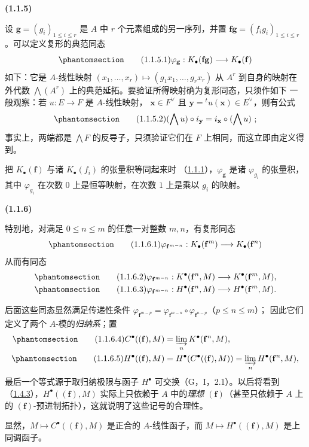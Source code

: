 \documentclass[UTF8,fontset=none,11pt,oneside,openany]{ctexbook}
\newenvironment{env}[1][]{%
  \par\medskip\noindent\textbf{(#1)}\ %
}{\par}
\newcommand{\oldpage}[2][]{%
  \hypertarget{ega-source-page-#1-#2}{}%
  \marginnote{\scriptsize\textbf{#1}~|~#2}\ignorespaces}
\let\EGAOriginalLabel\label
\renewcommand{\label}[1]{\phantomsection\EGAOriginalLabel{#1}}
\begin{document}
\begin{env}[1.1.5]
\label{III.1.1.5-fr}
设 $\mathbf g=(g_i)_{1\leq i\leq r}$ 是 $A$ 中 $r$ 个元素组成的另一序列，并置
$\mathbf f\mathbf g=(f_ig_i)_{1\leq i\leq r}$。可以定义复形的典范同态
\begin{equation}
\label{III.1.1.5.1-fr}
\tag{1.1.5.1}
\varphi_{\mathbf g}:K_\bullet(\mathbf f\mathbf g)\longrightarrow
K_\bullet(\mathbf f)
\end{equation}
如下：它是 $A$-线性映射
$(x_1,\ldots,x_r)\mapsto(g_1x_1,\ldots,g_rx_r)$ 从 $A^r$ 到自身的映射在
外代数 $\bigwedge(A^r)$ 上的典范延拓。要验证所得映射确为复形同态，只须作如下
一般观察：若 $u:E\to F$ 是 $A$-线性映射，
$\mathbf x\in F^\vee$ 且 $\mathbf y={}^tu(\mathbf x)\in E^\vee$，则有公式
\begin{equation}
\label{III.1.1.5.2-fr}
\tag{1.1.5.2}
(\bigwedge u)\circ i_{\mathbf y}=i_{\mathbf x}\circ(\bigwedge u)~;
\end{equation}
事实上，两端都是 $\bigwedge F$ 的反导子，只须验证它们在 $F$ 上相同，而这立即由定义得到。

把 $K_\bullet(\mathbf f)$ 与诸 $K_\bullet(f_i)$ 的张量积等同起来时
（\hyperref[III.1.1.1-fr]{1.1.1}），$\varphi_{\mathbf g}$ 是诸
$\varphi_{g_i}$ 的张量积，其中 $\varphi_{g_i}$ 在次数 $0$ 上是恒等映射，在次数 $1$
上是乘以 $g_i$ 的映射。
\end{env}

\begin{env}[1.1.6]
\label{III.1.1.6-fr}
特别地，对满足 $0\leq n\leq m$ 的任意一对整数 $m,n$，有复形同态
\begin{equation}
\label{III.1.1.6.1-fr}
\tag{1.1.6.1}
\varphi_{\mathbf f^{m-n}}:K_\bullet(\mathbf f^m)\longrightarrow
K_\bullet(\mathbf f^n)
\end{equation}
从而有同态
\begin{align}
\label{III.1.1.6.2-fr}
\tag{1.1.6.2}
\varphi_{\mathbf f^{m-n}} &:K^\bullet(\mathbf f^n,M)\longrightarrow
K^\bullet(\mathbf f^m,M),\\
\label{III.1.1.6.3-fr}
\tag{1.1.6.3}
\varphi_{\mathbf f^{m-n}} &:H^\bullet(\mathbf f^n,M)\longrightarrow
H^\bullet(\mathbf f^m,M).
\end{align}

\oldpage[III]{85}
后面这些同态显然满足传递性条件
$\varphi_{\mathbf f^{m-p}}=
\varphi_{\mathbf f^{m-n}}\circ\varphi_{\mathbf f^{n-p}}$（$p\leq n\leq m$）；
因此它们定义了两个 $A$-模的\emph{归纳系}；置
\begin{align}
\label{III.1.1.6.4-fr}
\tag{1.1.6.4}
C^\bullet((\mathbf f),M)&=\varinjlim_n K^\bullet(\mathbf f^n,M),\\
\label{III.1.1.6.5-fr}
\tag{1.1.6.5}
H^\bullet((\mathbf f),M)&=H^\bullet(C^\bullet((\mathbf f),M))
=\varinjlim_n H^\bullet(\mathbf f^n,M),
\end{align}
最后一个等式源于取归纳极限与函子 $H^\bullet$ 可交换（G，I，2.1）。以后将看到
（\hyperref[III.1.4.3-fr]{1.4.3}），$H^\bullet((\mathbf f),M)$ 实际上只依赖于
$A$ 中的\emph{理想 $(\mathbf f)$}（甚至只依赖于 $A$ 上的
$(\mathbf f)$-预进制拓扑），这就说明了这些记号的合理性。

显然，$M\mapsto C^\bullet((\mathbf f),M)$ 是正合的 $A$-线性函子，而
$M\mapsto H^\bullet((\mathbf f),M)$ 是上同调函子。
\end{env}
\end{document}
